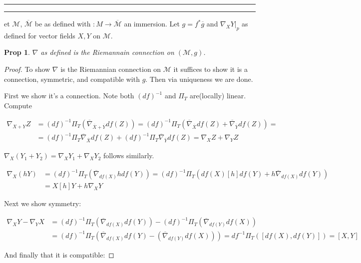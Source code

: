 \documentclass[11pt]{article}
\newcommand{\m}{\mathcal{M}}
\newcommand{\question}[2] {\vspace{.25in} \hrule\vspace{0.5em}
\noindent{\bf #1: #2} \vspace{0.5em}
\hrule \vspace{.10in}}
\newtheorem{prop}{Prop}
\begin{document}
\question{Question 2}

Let $\m$, $\overline{\m}$ be as defined with $ : M \to \overline{\m}$ an immersion. Let $g = f^* \overline{g}$ and $\nabla_X Y|_p$ as defined for vector fields $X,Y$ on $\m$.

\begin{prop}
	$\nabla$ as defined is the Riemannain connection on $(\m,g)$.
\end{prop}

\begin{proof}
	To show $\nabla$ is the Riemannian connection on $\m$ it suffices to show it is a connection, symmetric, and compatible with $g$. Then via uniqueness we are done.

	First we show it's a connection. Note both $(df)^{-1}$ and $\Pi_T$ are(locally) linear. Compute


	\begin{align*}
		\nabla_{X + Y} Z &= (df)^{-1}\Pi_T(\overline{\nabla}_{\overline{X} + \overline{Y}}df(Z)) = (df)^{-1}\Pi_T(\overline{\nabla}_{\overline{X}} df(Z) + \overline{\nabla}_{\overline{Y}}df(Z)) =\\ &=(df)^{-1}\Pi_T \overline{\nabla}_{\overline{X}} df(Z) + (df)^{-1}\Pi_T \overline{\nabla}_{\overline{Y}} df(Z) = \nabla_X Z + \nabla_Y Z
	\end{align*}

	$\nabla_X(Y_1 + Y_2) = \nabla_X Y_1 + \nabla_X Y_2$ follows similarly. 

	\begin{align*}
		\nabla_X (hY) &= (df)^{-1}\Pi_T(\overline{\nabla}_{df(X)}hdf(Y)) = (df)^{-1}\Pi_T(df(X)[h]df(Y) + h\overline{\nabla}_{df(X)}df(Y))\\
		&= X[h]Y + h \nabla_X Y
	\end{align*}

	Next we show symmetry:

	\begin{align*}
		\nabla_X Y - \nabla_Y X &= (df)^{-1}\Pi_T(\overline{\nabla}_{df(X)}df(Y)) - (df)^{-1}\Pi_T(\overline{\nabla}_{df(Y)}df(X)) \\
		&= (df)^{-1}\Pi_T(\overline{\nabla}_{df(X)}df(Y) - (\overline{\nabla}_{df(Y)}df(X))) = df^{-1}\Pi_T([df(X),df(Y)]) = [X,Y]
	\end{align*}


	And finally that it is compatible:


\end{proof}
\end{document}
